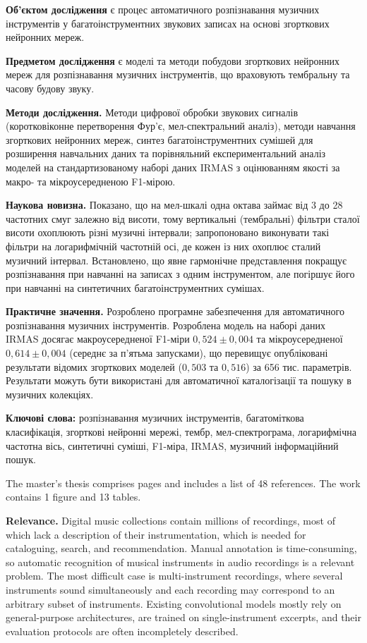 \textbf{Об'єктом дослідження} є процес автоматичного розпізнавання
музичних інструментів у багатоінструментних звукових записах на основі
згорткових нейронних мереж.

\textbf{Предметом дослідження} є моделі та методи побудови згорткових
нейронних мереж для розпізнавання музичних інструментів, що враховують
тембральну та часову будову звуку.

\textbf{Методи дослідження.}
Методи цифрової обробки звукових сигналів (коротковіконне перетворення
Фур'є, мел-спектральний аналіз), методи навчання згорткових нейронних
мереж, синтез багатоінструментних сумішей для розширення навчальних даних
та порівняльний експериментальний аналіз моделей на стандартизованому
наборі даних IRMAS з оцінюванням якості за макро- та мікроусередненою
F1-мірою.

\textbf{Наукова новизна.}
Показано, що на мел-шкалі одна октава займає від 3 до 28 частотних смуг
залежно від висоти, тому вертикальні (тембральні) фільтри сталої висоти
охоплюють різні музичні інтервали; запропоновано виконувати такі фільтри
на логарифмічній частотній осі, де кожен із них охоплює сталий музичний
інтервал. Встановлено, що явне гармонічне представлення покращує
розпізнавання при навчанні на записах з одним інструментом, але погіршує
його при навчанні на синтетичних багатоінструментних сумішах.

\textbf{Практичне значення.}
Розроблено програмне забезпечення для автоматичного розпізнавання
музичних інструментів. Розроблена модель на наборі даних IRMAS
досягає макроусередненої F1-міри $0{,}524 \pm 0{,}004$ та мікроусередненої
$0{,}614 \pm 0{,}004$ (середнє за п'ятьма запусками), що перевищує
опубліковані результати відомих згорткових моделей ($0{,}503$ та
$0{,}516$) за 656 тис. параметрів. Результати можуть бути використані для
автоматичної каталогізації та пошуку в музичних колекціях.

\textbf{Ключові слова:}
розпізнавання музичних інструментів, багатоміткова класифікація,
згорткові нейронні мережі, тембр, мел-спектрограма, логарифмічна
частотна вісь, синтетичні суміші, F1-міра, IRMAS, музичний
інформаційний пошук.

\abstractEng

The master's thesis comprises \pageref{LastPage} pages and includes a list of 48 references. The work contains 1 figure and 13 tables.

\textbf{Relevance.}
Digital music collections contain millions of recordings, most of which
lack a description of their instrumentation, which is needed for
cataloguing, search, and recommendation. Manual annotation is
time-consuming, so automatic recognition of musical instruments in audio
recordings is a relevant problem. The most difficult case is
multi-instrument recordings, where several instruments sound
simultaneously and each recording may correspond to an arbitrary subset
of instruments. Existing convolutional models mostly rely on
general-purpose architectures, are trained on single-instrument
excerpts, and their evaluation protocols are often incompletely
described.

